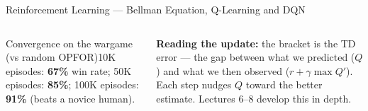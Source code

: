 \documentclass[aspectratio=169,10pt,t]{beamer}
\begin{document}
\begin{frame}{Reinforcement Learning --- Bellman Equation, Q-Learning and DQN}
\begin{columns}[T]
{\begin{tikzpicture}
\end{tikzpicture}}
\begin{cbox}[ISSAgrn]{Convergence on the wargame (vs random OPFOR)}\scriptsize 10K episodes: \textbf{67\%} win rate; 50K episodes: \textbf{85\%}; 100K episodes: \textbf{91\%} (beats a novice human).\end{cbox}
\begin{ibox}\scriptsize\textbf{Reading the update:} the bracket is the TD error --- the gap between what we predicted ($Q$) and what we then observed ($r+\gamma\max Q'$). Each step nudges $Q$ toward the better estimate. Lectures 6--8 develop this in depth.\end{ibox}
\end{columns}
\end{frame}

\end{document}
